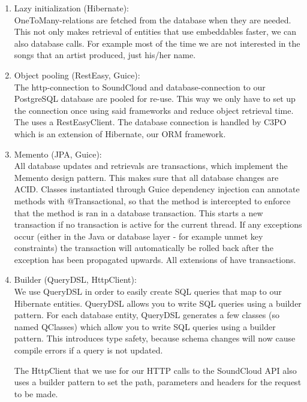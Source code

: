 \begin{enumerate}
\item Lazy initialization (Hibernate):\\
OneToMany-relations are fetched from the database when they are needed.
This not only makes retrieval of entities that use embeddables faster, we can also database calls.
For example most of the time we are not interested in the songs that an artist produced, just his/her name.

\item Object pooling (RestEasy, Guice):\\
The http-connection to SoundCloud and database-connection to our PostgreSQL database are pooled for re-use.
This way we only have to set up the connection once using said frameworks and reduce object retrieval time.
The  uses a RestEasyClient.
The database connection is handled by C3PO which is an extension of Hibernate, our \gls{ORM} framework.

\item Memento (JPA, Guice):\\
All database updates and retrievals are transactions, which implement the Memento design pattern.
This makes sure that all database changes are ACID\cite{ACID}.
Classes instantiated through Guice dependency injection can annotate methods with @Transactional, so that the method is intercepted to enforce that the method is ran in a database transaction.
This starts a new transaction if no transaction is active for the current thread.
If any exceptions occur (either in the Java or database layer - for example unmet key constraints) the transaction will automatically be rolled back after the exception has been propagated upwards.
All extensions of  have transactions.

\item Builder (QueryDSL, HttpClient):\\
We use QueryDSL in order to easily create SQL queries that map to our Hibernate entities.
QueryDSL allows you to write SQL queries using a builder pattern.
For each database entity, QueryDSL generates a few classes (so named QClasses) which allow you to write SQL queries using a builder pattern.
This introduces type safety, because schema changes will now cause compile errors if a query is not updated.

The HttpClient that we use for our HTTP calls to the SoundCloud API also uses a builder pattern to set the path, parameters and headers for the request to be made.

\end{enumerate}

